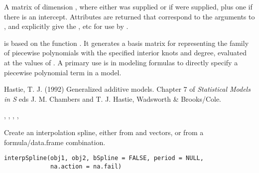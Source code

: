 %
\begin{Value}
A matrix of dimension , where either 
was supplied or if  were supplied,  plus one if there is an intercept.  Attributes
are returned that correspond to the arguments to , and
explicitly give the ,  etc for use by
.

 is based on the function .
It generates a basis matrix for
representing the family of piecewise polynomials with the specified
interior knots and degree, evaluated at the values of .  A
primary use is in modeling formulas to directly specify a piecewise
polynomial term in a model.
\end{Value}
%
\begin{References}\relax
Hastie, T. J. (1992)
Generalized additive models.
Chapter 7 of \emph{Statistical Models in S}
eds J. M. Chambers and T. J. Hastie, Wadsworth \& Brooks/Cole.
\end{References}
%
\begin{SeeAlso}\relax
{}, , ,
, 
\end{SeeAlso}
%
\begin{Examples}
\end{Examples}
%
\begin{Description}\relax
Create an interpolation spline, either from  and 
vectors, or from a formula/data.frame combination.
\end{Description}
%
\begin{Usage}
\begin{verbatim}
interpSpline(obj1, obj2, bSpline = FALSE, period = NULL,
             na.action = na.fail)
\end{verbatim}
\end{Usage}
